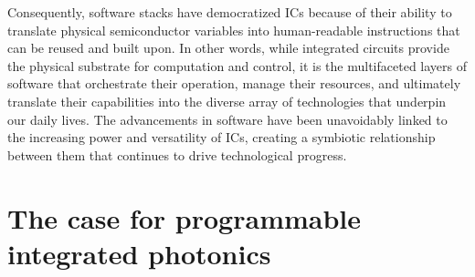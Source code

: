 Consequently, software stacks have democratized ICs because of their ability to translate physical semiconductor variables into human-readable instructions that can be reused and built upon.
In other words, while integrated circuits provide the physical substrate for computation and control, it is the multifaceted layers of software that orchestrate their operation, manage their resources, and ultimately translate their capabilities into the diverse array of technologies that underpin our daily lives.
The advancements in software have been unavoidably linked to the increasing power and versatility of ICs, creating a symbiotic relationship between them that continues to drive technological progress.

\section{The case for programmable integrated photonics} \label{sec:photonics_motivation}

